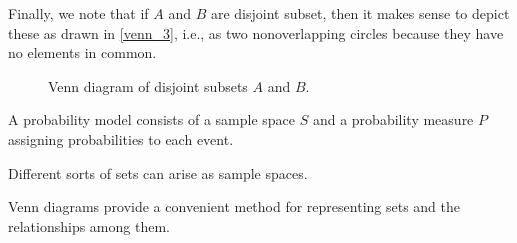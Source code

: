 Finally, we note that if $A$ and $B$ are disjoint subset, then it makes sense to depict these as drawn in
\autoref{venn_3}, i.e., as two nonoverlapping circles because they have no elements in common.
\begin{figure}[hb]
    \caption{Venn diagram of disjoint subsets $A$ and $B$.}\label{venn_3}
\end{figure}

\begin{summary}
    \item A probability model consists of a sample space $S$ and a probability measure $P$ assigning probabilities to
    each event.
    \item Different sorts of sets can arise as sample spaces.
    \item Venn diagrams provide a convenient method for representing sets and the relationships among them.
\end{summary}

